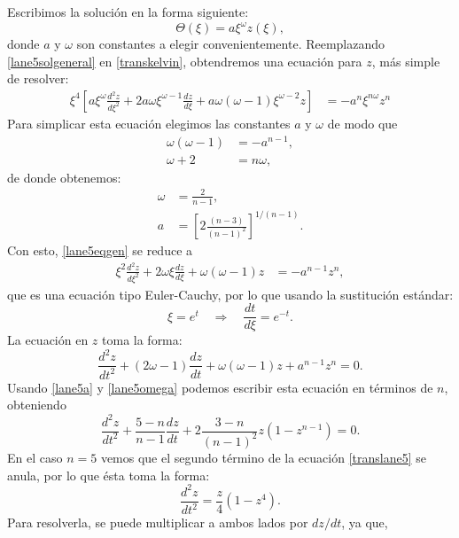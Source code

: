 Escribimos la solución en la forma siguiente:
\begin{equation}\label{lane5solgeneral}
 \Theta(\xi)=a\xi^{\omega}z(\xi),
\end{equation}
donde $a$ y $\omega$ son constantes a elegir convenientemente. Reemplazando \eqref{lane5solgeneral} en \eqref{transkelvin}, obtendremos una ecuación  para $z$, más simple de resolver:
\begin{align}\label{lane5eqgen}
 \xi^4\left[a\xi^{\omega}\frac{d^2 z}{d\xi^2}+2a\omega\xi^{\omega-1}\frac{dz}{d\xi}+a\omega(\omega-1)\xi^{\omega-2}z\right]&=-a^{n}\xi^{n\omega}z^n
 \end{align}
 Para simplicar esta ecuación elegimos las constantes $a$ y $\omega$ de modo que
\begin{align}
\omega(\omega-1)&=-a^{n-1},\label{lane5a}\\
\omega+2&=n\omega,
\end{align}
de donde obtenemos:
\begin{align}
\omega&=\frac{2}{n-1} \label{lane5omega},\\
a&=\left[2\frac{(n-3)}{(n-1)^2}\right]^{1/(n-1)}\label{lane5a2}.
\end{align}
Con esto, \eqref{lane5eqgen} se reduce a 
\begin{align}
\xi^2\frac{d^2 z}{d\xi^2}+2\omega\xi\frac{dz}{d\xi}+\omega(\omega-1)z&=-a^{n-1}z^n,
\end{align}
que es una ecuación tipo Euler-Cauchy, por lo que usando la sustitución estándar:
\begin{equation}\label{euler-sust}
 \xi=e^{t}\quad\Rightarrow\quad \frac{dt}{d\xi}=e^{-t}.
\end{equation}
La ecuación en $z$ toma la forma:
\begin{equation}
 \frac{d^2 z}{dt^2}+(2\omega-1)\frac{dz}{dt}+\omega(\omega-1)z+a^{n-1}z^n=0.
\end{equation}
Usando \eqref{lane5a} y \eqref{lane5omega} podemos escribir esta ecuación en términos de $n$, obteniendo
\begin{equation}\label{translane5}
 \frac{d^2 z}{dt^2}+\frac{5-n}{n-1}\frac{dz}{dt}+2\frac{3-n}{(n-1)^2}z(1-z^{n-1})=0.
\end{equation}
En el caso $n=5$ vemos que el segundo término de la ecuación \eqref{translane5} se anula, por lo que ésta toma la forma:
\begin{equation}\label{translane5b}
 \frac{d^2 z}{dt^2}=\frac{z}{4}(1-z^4).
\end{equation}
Para resolverla, se puede multiplicar a ambos lados por $dz/dt$, ya que,
